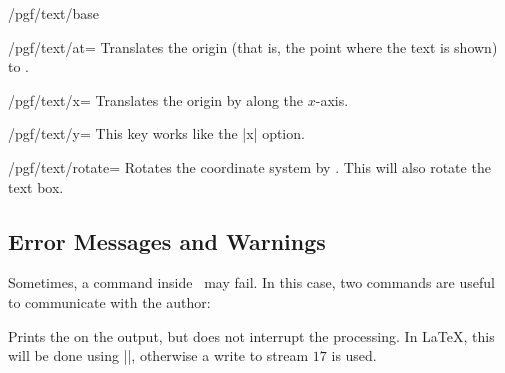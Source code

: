 \begin{command}{\pgftext{}}
\begin{key}{/pgf/text/base}
\begin{codeexample}[]
\end{codeexample}
  \end{key}
  \begin{key}{/pgf/text/at=}
    Translates the origin (that is, the point where the text is
    shown) to .
\begin{codeexample}[]
\end{codeexample}
  \end{key}
  \begin{key}{/pgf/text/x=}
    Translates the origin by  along the $x$-axis.
\begin{codeexample}[]
\end{codeexample}
  \end{key}
  \begin{key}{/pgf/text/y=}
    This key works like the |x| option.
  \end{key}
  \begin{key}{/pgf/text/rotate=}
    Rotates the coordinate system by . This will also
    rotate the text box.
\begin{codeexample}[]
\end{codeexample}
\end{key}

\end{command}


\subsection{Error Messages and Warnings}

Sometimes, a command inside \pgfname\ may fail. In this case, two
commands are useful to communicate with the author:


\begin{command}{\pgfwarning{}}
  Prints the  on the output, but does not interrupt the
  processing. In \LaTeX, this will be done using |\PackageWarning|,
  otherwise a write to stream $17$ is used.
\end{command}
